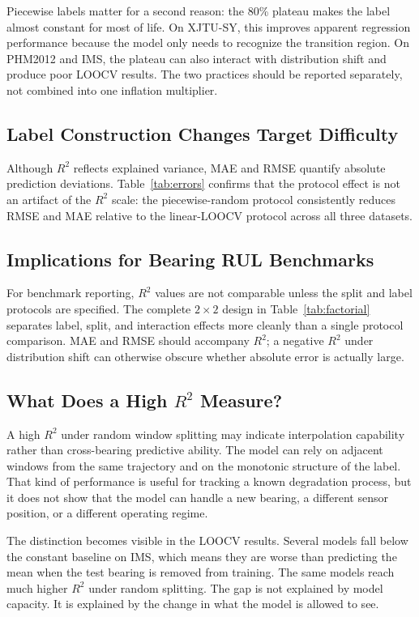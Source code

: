 \documentclass[pdflatex,sn-mathphys-num]{sn-jnl}
\begin{document}
Piecewise labels matter for a second reason: the 80\% plateau makes the label almost constant for most of life. On XJTU-SY, this improves apparent regression performance because the model only needs to recognize the transition region. On PHM2012 and IMS, the plateau can also interact with distribution shift and produce poor LOOCV results. The two practices should be reported separately, not combined into one inflation multiplier.
\subsection{Label Construction Changes Target Difficulty}

Although $R^2$ reflects explained variance, MAE and RMSE quantify absolute prediction deviations. Table~\ref{tab:errors} confirms that the protocol effect is not an artifact of the $R^2$ scale: the piecewise-random protocol consistently reduces RMSE and MAE relative to the linear-LOOCV protocol across all three datasets.

\subsection{Implications for Bearing RUL Benchmarks}
For benchmark reporting, $R^2$ values are not comparable unless the split and label protocols are specified. The complete $2 \times 2$ design in Table~\ref{tab:factorial} separates label, split, and interaction effects more cleanly than a single protocol comparison. MAE and RMSE should accompany $R^2$; a negative $R^2$ under distribution shift can otherwise obscure whether absolute error is actually large.

\subsection{What Does a High $R^2$ Measure?}
A high $R^2$ under random window splitting may indicate interpolation capability rather than cross-bearing predictive ability. The model can rely on adjacent windows from the same trajectory and on the monotonic structure of the label. That kind of performance is useful for tracking a known degradation process, but it does not show that the model can handle a new bearing, a different sensor position, or a different operating regime.

The distinction becomes visible in the LOOCV results. Several models fall below the constant baseline on IMS, which means they are worse than predicting the mean when the test bearing is removed from training. The same models reach much higher $R^2$ under random splitting. The gap is not explained by model capacity. It is explained by the change in what the model is allowed to see.
\end{document}
